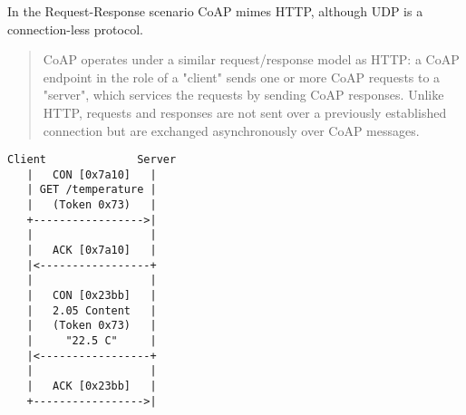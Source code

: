 In the Request-Response scenario CoAP mimes HTTP, although UDP is a connection-less protocol.

\begin{quote}
CoAP operates under a similar request/response model as HTTP: a CoAP 
endpoint in the role of a "client" sends one or more CoAP requests to
a "server", which services the requests by sending CoAP responses.
Unlike HTTP, requests and responses are not sent over a previously
established connection but are exchanged asynchronously over CoAP
messages.
\end{quote}

\begin{verbatim}
Client              Server
   |   CON [0x7a10]   |
   | GET /temperature |
   |   (Token 0x73)   |
   +----------------->|
   |                  |
   |   ACK [0x7a10]   |
   |<-----------------+
   |                  |
   |   CON [0x23bb]   |
   |   2.05 Content   |
   |   (Token 0x73)   |
   |     "22.5 C"     |
   |<-----------------+
   |                  |
   |   ACK [0x23bb]   |
   +----------------->|
\end{verbatim}
